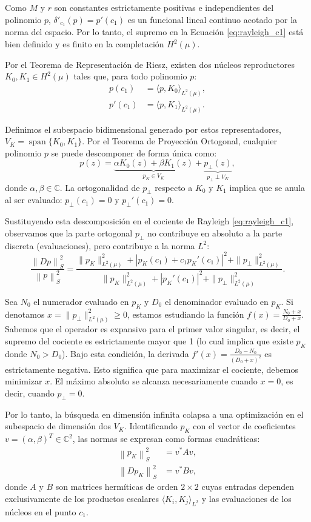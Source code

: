 \documentclass[12pt,a4paper]{article}
\theoremstyle{definition}
\theoremstyle{remark}
\newcommand{\C}{\mathbb{C}}
\newcommand{\norm}[1]{\left\| #1 \right\|_S}
\newcommand{\abs}[1]{\left| #1 \right|}
\begin{document}
Como $M$ y $r$ son constantes estrictamente positivas e independientes del polinomio $p$, $\delta'_{c_1}(p) = p'(c_1)$ es un funcional lineal continuo acotado por la norma del espacio. Por lo tanto, el supremo en la Ecuación \eqref{eq:rayleigh_c1} está bien definido y es finito en la completación $H^2(\mu)$.

Por el Teorema de Representación de Riesz, existen dos núcleos reproductores $K_0, K_1 \in H^2(\mu)$ tales que, para todo polinomio $p$:
\begin{align*}
    p(c_1)  & = \langle p, K_0 \rangle_{L^2(\mu)}, \\
    p'(c_1) & = \langle p, K_1 \rangle_{L^2(\mu)}.
\end{align*}

Definimos el subespacio bidimensional generado por estos representadores, $V_K = \operatorname{span}\{K_0, K_1\}$. Por el Teorema de Proyección Ortogonal, cualquier polinomio $p$ se puede descomponer de forma única como:
$$ p(z) = \underbrace{\alpha K_0(z) + \beta K_1(z)}_{p_K \in V_K} + \underbrace{p_{\perp}(z)}_{p_{\perp} \perp V_K}, $$
donde $\alpha, \beta \in \C$. La ortogonalidad de $p_{\perp}$ respecto a $K_0$ y $K_1$ implica que se anula al ser evaluado: $p_{\perp}(c_1) = 0$ y $p_{\perp}'(c_1) = 0$.

Sustituyendo esta descomposición en el cociente de Rayleigh \eqref{eq:rayleigh_c1}, observamos que la parte ortogonal $p_{\perp}$ no contribuye en absoluto a la parte discreta (evaluaciones), pero contribuye a la norma $L^2$:
$$ \frac{\norm{Dp}^2}{\norm{p}^2} = \frac{\|p_K\|_{L^2(\mu)}^2 + \abs{p_K(c_1) + c_1 p_K'(c_1)}^2 + \|p_{\perp}\|_{L^2(\mu)}^2}{\|p_K\|_{L^2(\mu)}^2 + \abs{p_K'(c_1)}^2 + \|p_{\perp}\|_{L^2(\mu)}^2}. $$

Sea $N_0$ el numerador evaluado en $p_K$ y $D_0$ el denominador evaluado en $p_K$. Si denotamos $x = \|p_{\perp}\|_{L^2(\mu)}^2 \geq 0$, estamos estudiando la función $f(x) = \frac{N_0 + x}{D_0 + x}$.
Sabemos que el operador es expansivo para el primer valor singular, es decir, el supremo del cociente es estrictamente mayor que 1 (lo cual implica que existe $p_K$ donde $N_0 > D_0$). Bajo esta condición, la derivada $f'(x) = \frac{D_0 - N_0}{(D_0 + x)^2}$ es estrictamente negativa. Esto significa que para maximizar el cociente, debemos minimizar $x$. El máximo absoluto se alcanza necesariamente cuando $x = 0$, es decir, cuando $p_{\perp} = 0$.

Por lo tanto, la búsqueda en dimensión infinita colapsa a una optimización en el subespacio de dimensión dos $V_K$. Identificando $p_K$ con el vector de coeficientes $v = (\alpha, \beta)^T \in \C^2$, las normas se expresan como formas cuadráticas:
\begin{align*}
    \norm{p_K}^2   & = v^* A v, \\
    \norm{D p_K}^2 & = v^* B v,
\end{align*}
donde $A$ y $B$ son matrices hermíticas de orden $2 \times 2$ cuyas entradas dependen exclusivamente de los productos escalares $\langle K_i, K_j \rangle_{L^2}$ y las evaluaciones de los núcleos en el punto $c_1$.
\end{document}
